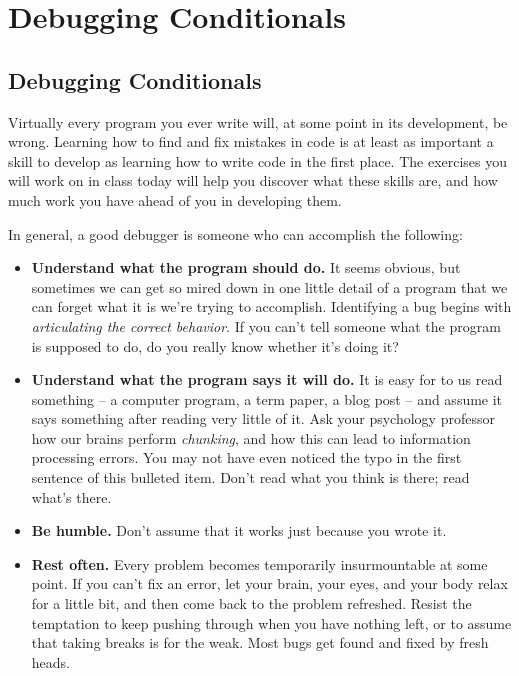 
\setcounter{chapter}{7}
\chapter{Debugging Conditionals}


\minitoc

\section{Debugging Conditionals}

Virtually every program you ever write will, at some point in its development, be wrong.  Learning how to find and fix mistakes in code is at least as important a skill to develop as learning how to write code in the first place.  The exercises you will work on in class today will help you discover what these skills are, and how much work you have ahead of you in developing them.

In general, a good debugger is someone who can accomplish the following:

\begin{itemize}
    \item \textbf{Understand what the program should do.}  It seems obvious, but sometimes we can get so mired down in one little detail of a program that we can forget what it is we're trying to accomplish.  Identifying a bug begins with \textit{articulating the correct behavior}.  If you can't tell someone what the program is supposed to do, do you really know whether it's doing it?
    \item \textbf{Understand what the program says it will do.}  It is easy for to us read something -- a computer program, a term paper, a blog post -- and assume it says something after reading very little of it.  Ask your psychology professor how our brains perform \textit{chunking}, and how this can lead to information processing errors.  You may not have even noticed the typo in the first sentence of this bulleted item.  Don't read what you think is there; read what's there.
    \item \textbf{Be humble.}  Don't assume that it works just because you wrote it.
    \item \textbf{Rest often.}  Every problem becomes temporarily insurmountable at some point.  If you can't fix an error, let your brain, your eyes, and your body relax for a little bit, and then come back to the problem refreshed.  Resist the temptation to keep pushing through when you have nothing left, or to assume that taking breaks is for the weak.  Most bugs get found and fixed by fresh heads.
\end{itemize}